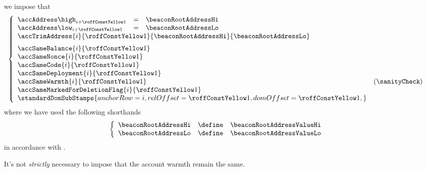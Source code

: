 \item[\underline{\underline{Loading the \inst{BEACONROOT} system smart contract:}}] 
	we impose that
	\[
		\left\{ \begin{array}{lclr}
			\accAddress  \high _{i + \roffTxSkipSysiBeaconRootSystemContractAccount} & = & \beaconRootAddressHi \\
			\accAddress  \low  _{i + \roffTxSkipSysiBeaconRootSystemContractAccount} & = & \beaconRootAddressLo \\
			\multicolumn{4}{l}{
				\accTrimAddress
				{i}{\roffTxSkipSysiBeaconRootSystemContractAccount}
				{\beaconRootAddressHi}
				{\beaconRootAddressLo}} \vspace{2mm} \\
			\multicolumn{3}{l}{\accSameBalance                       {i}{\roffTxSkipSysiBeaconRootSystemContractAccount}} \\
			\multicolumn{3}{l}{\accSameNonce                         {i}{\roffTxSkipSysiBeaconRootSystemContractAccount}} \\
			\multicolumn{3}{l}{\accSameCode                          {i}{\roffTxSkipSysiBeaconRootSystemContractAccount}} \\
			\multicolumn{3}{l}{\accSameDeployment                    {i}{\roffTxSkipSysiBeaconRootSystemContractAccount}} \\
			\multicolumn{3}{l}{\accSameWarmth                        {i}{\roffTxSkipSysiBeaconRootSystemContractAccount}} & (\sanityCheck) \\
			\multicolumn{3}{l}{\accSameMarkedForDeletionFlag         {i}{\roffTxSkipSysiBeaconRootSystemContractAccount}} \\
			\multicolumn{3}{l}{
				\standardDomSubStamps {
					anchorRow = i                                              ,
					relOffset = \roffTxSkipSysiBeaconRootSystemContractAccount ,
					domOffset = \roffTxSkipSysiBeaconRootSystemContractAccount ,
				}
			} \\
		\end{array} \right.
	\]
	where we have used the following shorthands
	\[
		\left\{ \begin{array}{lcl}
			\beaconRootAddressHi & \define & \beaconRootAddressValueHi \\
			\beaconRootAddressLo & \define & \beaconRootAddressValueLo \\
		\end{array} \right.
	\]
	in accordance with \cite{EIP-4788}.

	\saNote{} \label{hub: tx skip: sysi: eip 4788: transaction processing: account warmth constancy not strictly necessary}
	It's not \emph{strictly} necessary to impose that the account warmth remain the same.
